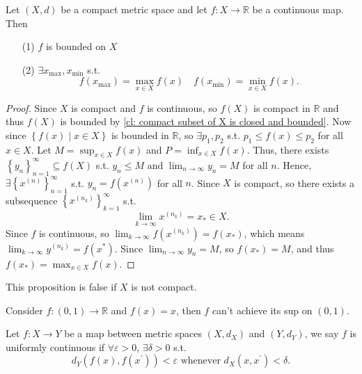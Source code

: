\begin{proposition}
    Let \((X, d)\) be a compact metric space and let \(f: X \to \mathbb{R} \) be a continuous map. Then 
    \begin{itemize}
        \item [(1)] \(f\) is bounded on \(X\)
        \item [(2)] \(\exists x_{\text{max}}, x_{\text{min}}\) s.t. 
        \[
            f \left( x_{\text{max}} \right) = \max _{x \in X} f(x) \quad f \left( x_{\text{min}} \right) = \min _{x \in X} f(x). 
        \]
    \end{itemize}  
\end{proposition}

\begin{proof}
    Since \(X\) is compact and \(f\) is continuous, so \(f(X)\) is compact in \(\mathbb{R} \) and thus \(f(X)\) is bounded by \autoref{cl: compact subset of X is closed and bounded}. Now since \(\left\{ f(x) \mid x \in X \right\} \) is bounded in \(\mathbb{R} \), so \(\exists p_1, p_2\) s.t. \(p_1 \le f(x) \le p_2\) for all \(x \in X\). Let \(M = \sup_{x \in X} f(x)\) and \(P = \inf _{x \in X} f(x)\). Thus, there exists \(\left\{ y_n \right\}_{n=1}^{\infty} \subseteq f(X) \) s.t. \(y_n \le M\) and \(\lim_{n \to \infty} y_n = M \) for all \(n\). Hence, \(\exists \left\{ x^{(n)} \right\}_{n=1}^{\infty}  \) s.t. \(y_n = f \left( x^{(n)} \right) \) for all \(n\). Since \(X\) is compact, so there exists a subsequence \(\left\{ x^{(n_k)} \right\}_{k=1}^{\infty}  \) s.t. 
    \[
        \lim_{k \to \infty} x^{(n_k)} = x_{\ast} \in X. 
    \]  Since \(f\) is continuous, so \(\lim_{k \to \infty} f \left( x^{(n_k)} \right) = f \left( x_{\ast}  \right)   \), which means \(\lim_{k \to \infty} y^{(n_k)} = f \left( x^* \right)  \). Since \(\lim_{n \to \infty}y_n = M \), so \(f(x_{\ast} ) = M\), and thus \(f \left( x_{\ast}  \right) = \max _{x \in X} f(x) \).                        
\end{proof}

\begin{eg}
    This proposition is false if \(X\) is not compact.  
\end{eg}
\begin{explanation}
    Consider \(f:(0, 1) \to \mathbb{R} \) and \(f(x) =x\), then \(f\) can't achieve its sup on \((0, 1)\).    
\end{explanation}

\begin{definition} \label{def: uniformly conti}
    Let \(f:X \to Y\) be a map between metric spaces \((X, d_X)\) and \((Y, d_Y)\), we say \(f\) is uniformly continuous if \(\forall\varepsilon > 0\), \(\exists \delta > 0\) s.t. 
    \[
        d_Y (f(x), f \left( x^{\prime}  \right) ) < \varepsilon \text{ whenever } d_X \left( x, x^{\prime}  \right) < \delta. 
    \]      
\end{definition}

